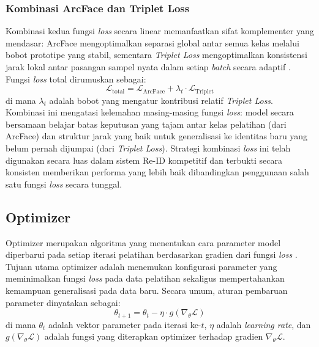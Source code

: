 \subsubsection{Kombinasi ArcFace dan Triplet Loss}
 
Kombinasi kedua fungsi \textit{loss} secara linear memanfaatkan sifat komplementer yang mendasar: ArcFace mengoptimalkan separasi global antar semua kelas melalui bobot prototipe yang stabil, sementara \textit{Triplet Loss} mengoptimalkan konsistensi jarak lokal antar pasangan sampel nyata dalam setiap \textit{batch} secara adaptif \cite{deng2019arcface, schroff2015facenet}. Fungsi \textit{loss} total dirumuskan sebagai:
\begin{equation}
    \mathcal{L}_{\text{total}}
    = \mathcal{L}_{\text{ArcFace}} + \lambda_t \cdot \mathcal{L}_{\text{Triplet}}
\end{equation}
di mana $\lambda_t$ adalah bobot yang mengatur kontribusi relatif \textit{Triplet Loss}. Kombinasi ini mengatasi kelemahan masing-masing fungsi \textit{loss}: model secara bersamaan belajar batas keputusan yang tajam antar kelas pelatihan (dari ArcFace) dan struktur jarak yang baik untuk generalisasi ke identitas baru yang belum pernah dijumpai (dari \textit{Triplet Loss}). Strategi kombinasi \textit{loss} ini telah digunakan secara luas dalam sistem Re-ID kompetitif \cite{hermans2017defense} dan terbukti secara konsisten memberikan performa yang lebih baik dibandingkan penggunaan salah satu fungsi \textit{loss} secara tunggal.

\subsection{Optimizer}
Optimizer merupakan algoritma yang menentukan cara parameter model diperbarui pada setiap iterasi pelatihan berdasarkan gradien dari fungsi \textit{loss} \cite{kingma2015adam}. Tujuan utama optimizer adalah menemukan konfigurasi parameter yang meminimalkan fungsi \textit{loss} pada data pelatihan sekaligus mempertahankan kemampuan generalisasi pada data baru. Secara umum, aturan pembaruan parameter dinyatakan sebagai:
\begin{equation}
    \theta_{t+1} = \theta_t - \eta \cdot g(\nabla_\theta \mathcal{L})
\end{equation}
di mana $\theta_t$ adalah vektor parameter pada iterasi ke-$t$, $\eta$ adalah \textit{learning rate}, dan $g(\nabla_\theta \mathcal{L})$ adalah fungsi yang diterapkan optimizer terhadap gradien $\nabla_\theta \mathcal{L}$.

